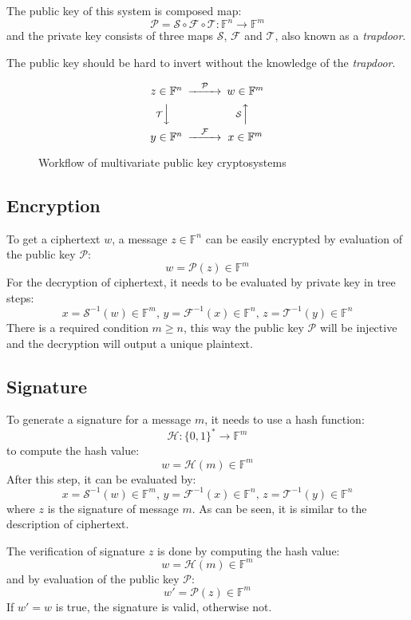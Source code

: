 \documentclass[thesis=M,english]{FITthesis}[2019/12/23]
\begin{document}
The public key of this system is composed map:
\[
\mathcal{P} = \mathcal{S} \circ \mathcal{F} \circ \mathcal{T} : \mathbb{F}^n \rightarrow \mathbb{F}^m
\]
and the private key consists of three maps $\mathcal{S}$, $\mathcal{F}$ and $\mathcal{T}$, also known as a \textit{trapdoor}.

The public key should be hard to invert without the knowledge of the \textit{trapdoor}.

\begin{figure}[h]
\begin{equation*}
\begin{CD}
z \in \mathbb{F}^n @> \mathcal{P} >> w \in \mathbb{F}^m \\
@V\mathcal{T}VV @A\mathcal{S}AA \\
y \in \mathbb{F}^n @> \mathcal{F} >> x \in \mathbb{F}^m
\end{CD}
\end{equation*}
\caption{Workflow of multivariate public key cryptosystems}
\end{figure}
\smallskip

\subsection{Encryption}
To get a ciphertext $w$, a message $z \in \mathbb{F}^n$ can be easily encrypted by evaluation of the public key $\mathcal{P}$:
\[
w = \mathcal{P}(z) \in \mathbb{F}^m
\]
For the decryption of ciphertext, it needs to be evaluated by private key in tree steps:
\[
x = \mathcal{S}^{-1}(w) \in \mathbb{F}^m, \, y = \mathcal{F}^{-1}(x) \in \mathbb{F}^n, \, z = \mathcal{T}^{-1}(y) \in \mathbb{F}^n
\]
There is a required condition $m \geq n$, this way the public key $\mathcal{P}$ will be injective and the decryption will output a unique plaintext.

\subsection{Signature}
To generate a signature for a message $m$, it needs to use a hash function:
\[
\mathcal{H}: \{0,1\}^{*} \rightarrow \mathbb{F}^m
\]
to compute the hash value:
\[
w = \mathcal{H}(m) \in \mathbb{F}^m
\]
After this step, it can be evaluated by:
\[
x = \mathcal{S}^{-1}(w) \in \mathbb{F}^m, \, y = \mathcal{F}^{-1}(x) \in \mathbb{F}^n, \, z = \mathcal{T}^{-1}(y) \in \mathbb{F}^n
\]
where $z$ is the signature of message $m$. As can be seen, it is similar to the description of ciphertext.

The verification of signature $z$ is done by computing the hash value:
\[
w = \mathcal{H}(m) \in \mathbb{F}^m
\]
and by evaluation of the public key $\mathcal{P}$:
\[
w' = \mathcal{P}(z) \in \mathbb{F}^m
\]
If $w' = w$ is true, the signature is valid, otherwise not.
\end{document}
